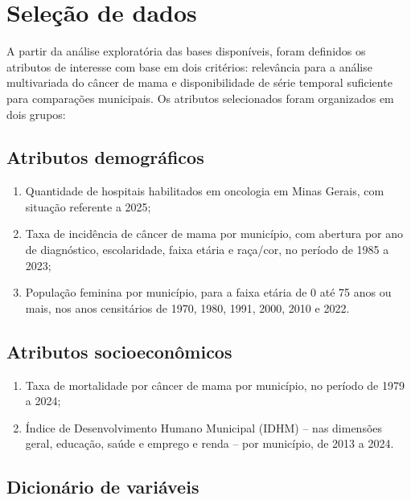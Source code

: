 \section{Seleção de dados}

A partir da análise exploratória das bases disponíveis, foram definidos os atributos de interesse com base em dois critérios: relevância para a análise multivariada do câncer de mama e disponibilidade de série temporal suficiente para comparações municipais. Os atributos selecionados foram organizados em dois grupos:

\subsection{Atributos demográficos}

\begin{enumerate}
    \item Quantidade de hospitais habilitados em oncologia em Minas Gerais, com situação referente a 2025;
    \item Taxa de incidência de câncer de mama por município, com abertura por ano de diagnóstico, escolaridade, faixa etária e raça/cor, no período de 1985 a 2023;
    \item População feminina por município, para a faixa etária de 0 até 75 anos ou mais, nos anos censitários de 1970, 1980, 1991, 2000, 2010 e 2022.
\end{enumerate}

\subsection{Atributos socioeconômicos}

\begin{enumerate}
    \item Taxa de mortalidade por câncer de mama por município, no período de 1979 a 2024;
    \item Índice de Desenvolvimento Humano Municipal (IDHM) -- nas dimensões geral, educação, saúde e emprego e renda -- por município, de 2013 a 2024.
\end{enumerate}

\subsection{Dicionário de variáveis}

